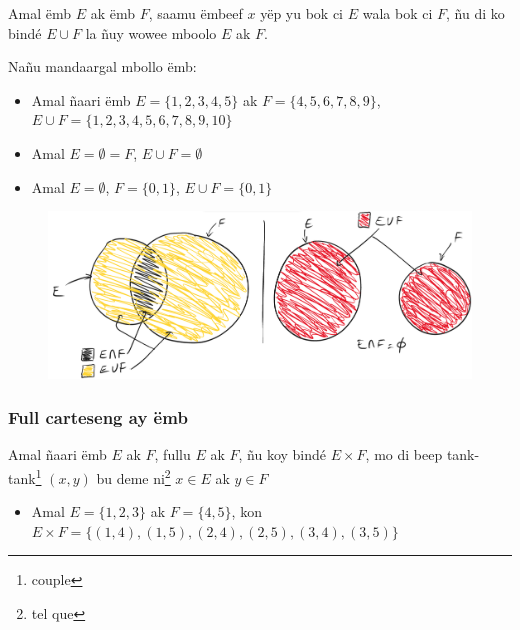 \documentclass[twoside, a4paper]{article}
\begin{document}
\begin{tcolorbox}[enhanced jigsaw,breakable,pad at break*=1mm,
    colback=red!5!white,colframe=white!75!black,title= Téeki,
    watermark color=white]
  Amal ëmb $E$ ak ëmb $F$, saamu ëmbeef $x$ yëp yu bok ci $E$ wala bok ci $F$, ñu di ko bindé $E \cup F$  la ñuy wowee mboolo $E$ ak $F$.
\end{tcolorbox}

Nañu mandaargal mbollo ëmb:
\begin{itemize}
  \item Amal  ñaari ëmb $E = \{1,2,3,4,5\}$ ak $F=\{4,5,6,7,8,9\}$, $E \cup F =\{1,2,3,4,5,6,7,8,9,10\}$
  \item Amal $E = \emptyset = F$, $E \cup F = \emptyset$
  \item Amal $E = \emptyset$, $F = \{0,1\}$, $E \cup F = \{0,1\}$
\end{itemize}

\begin{figure}[ht]
  \centering
  \includegraphics[scale = 0.5]{image/mbollo_selebe_emb.png}
  \label{fig:mbollo_selebe_emb}
\end{figure}


\subsubsection{Full carteseng ay ëmb}
\begin{tcolorbox}[enhanced jigsaw,breakable,pad at break*=1mm, colback=red!5!white,colframe=white!75!black,title= Téeki,
    watermark color=white]
  Amal ñaari ëmb $E$ ak $F$, fullu $E$ ak $F$, ñu koy bindé $E \times F$, mo di beep tank-tank\footnote{couple} $(x,y)$ bu deme ni\footnote{tel que} $x \in E$ ak $y\in F$
\end{tcolorbox}

\begin{itemize}
  \item Amal $E=\{1,2,3\}$ ak $F = \{4,5\}$, kon $E\times F =\big\{(1,4), (1,5), (2,4), (2,5), (3,4), (3,5)\big\}$
\end{itemize}
\end{document}
